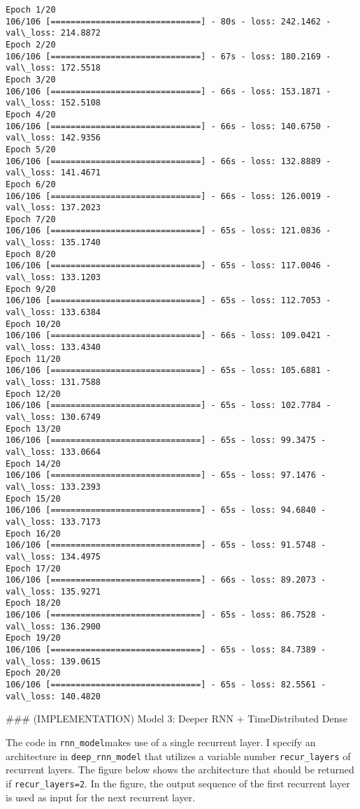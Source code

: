 \documentclass[11pt]{article}
\begin{document}
    \begin{Verbatim}[commandchars=\\\{\}]
Epoch 1/20
106/106 [==============================] - 80s - loss: 242.1462 - val\_loss: 214.8872
Epoch 2/20
106/106 [==============================] - 67s - loss: 180.2169 - val\_loss: 172.5518
Epoch 3/20
106/106 [==============================] - 66s - loss: 153.1871 - val\_loss: 152.5108
Epoch 4/20
106/106 [==============================] - 66s - loss: 140.6750 - val\_loss: 142.9356
Epoch 5/20
106/106 [==============================] - 66s - loss: 132.8889 - val\_loss: 141.4671
Epoch 6/20
106/106 [==============================] - 66s - loss: 126.0019 - val\_loss: 137.2023
Epoch 7/20
106/106 [==============================] - 65s - loss: 121.0836 - val\_loss: 135.1740
Epoch 8/20
106/106 [==============================] - 65s - loss: 117.0046 - val\_loss: 133.1203
Epoch 9/20
106/106 [==============================] - 65s - loss: 112.7053 - val\_loss: 133.6384
Epoch 10/20
106/106 [==============================] - 66s - loss: 109.0421 - val\_loss: 133.4340
Epoch 11/20
106/106 [==============================] - 65s - loss: 105.6881 - val\_loss: 131.7588
Epoch 12/20
106/106 [==============================] - 65s - loss: 102.7784 - val\_loss: 130.6749
Epoch 13/20
106/106 [==============================] - 65s - loss: 99.3475 - val\_loss: 133.0664
Epoch 14/20
106/106 [==============================] - 65s - loss: 97.1476 - val\_loss: 133.2393
Epoch 15/20
106/106 [==============================] - 65s - loss: 94.6840 - val\_loss: 133.7173
Epoch 16/20
106/106 [==============================] - 65s - loss: 91.5748 - val\_loss: 134.4975
Epoch 17/20
106/106 [==============================] - 66s - loss: 89.2073 - val\_loss: 135.9271
Epoch 18/20
106/106 [==============================] - 65s - loss: 86.7528 - val\_loss: 136.2900
Epoch 19/20
106/106 [==============================] - 65s - loss: 84.7389 - val\_loss: 139.0615
Epoch 20/20
106/106 [==============================] - 65s - loss: 82.5561 - val\_loss: 140.4820

    \end{Verbatim}

     \#\#\# (IMPLEMENTATION) Model 3: Deeper RNN + TimeDistributed Dense

The code in \texttt{rnn\_model}makes use of a single recurrent layer. I
specify an architecture in \texttt{deep\_rnn\_model} that utilizes a
variable number \texttt{recur\_layers} of recurrent layers. The figure
below shows the architecture that should be returned if
\texttt{recur\_layers=2}. In the figure, the output sequence of the
first recurrent layer is used as input for the next recurrent layer.
\end{document}
